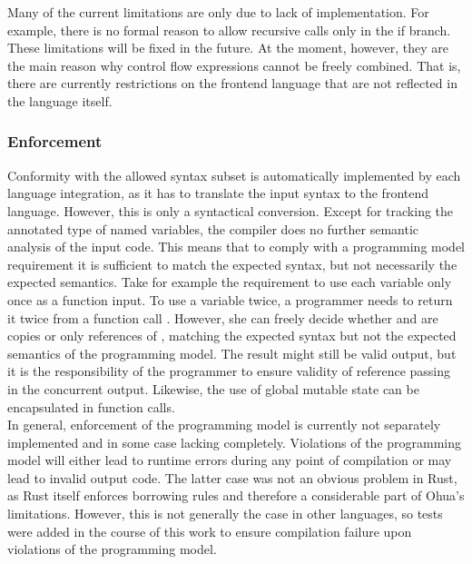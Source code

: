 Many of the current limitations are only due to lack of implementation. For example, there is no formal reason to allow recursive calls only in the if branch. These limitations will be fixed in the future. At the moment, however, they are the main reason why control flow expressions cannot be freely combined. That is, there are currently restrictions on the frontend language that are not reflected in the language itself.



\subsubsection{Enforcement}

Conformity with the allowed syntax subset is automatically implemented by each language integration, as it has to translate the input syntax to the frontend language. However, this is only a syntactical conversion. Except for tracking the annotated type of named variables, the compiler does no further semantic analysis of the input code. This means that to comply with a programming model requirement it is sufficient to match the expected syntax, but not necessarily the expected semantics. Take for example the requirement to use each variable only once as a function input. To use a variable  twice, a programmer needs to return it twice from a function call . However, she can freely decide whether  and  are copies or only references of , matching the expected syntax but not the expected semantics of the programming model. The result might still be valid output, but it is the responsibility of the programmer to ensure validity of reference passing in the concurrent output. Likewise, the use of global mutable state can be encapsulated in function calls. \\

In general, enforcement of the programming model is currently not separately implemented and in some case lacking completely. Violations of the programming model will either lead to runtime errors during any point of compilation or may lead to invalid output code. The latter case was not an obvious problem in Rust, as Rust itself enforces borrowing rules and therefore a considerable part of Ohua's limitations. However, this is not generally the case in other languages, so tests were added in the course of this work to ensure compilation failure upon violations of the programming model.


